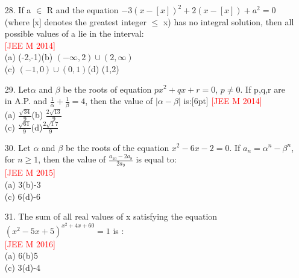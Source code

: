 \documentclass[journal,12pt,twocolumn]{IEEEtran}
\theoremstyle{remark}
\begin{document}
\begin{enumerate}
(c)  1:3:2\hspace{2.7cm}(d)  3:1:2\\[6pt] 
\item[28.]If a $\in$ R and the equation  $-3(x-[x])^2 +2(x-[x])+a^2 =0$ (where [x] denotes the greatest integer $\leq$ x) has no integral solution, then all possible values of a lie in the interval:\\[2pt]
\phantom{2cm}\hspace{4.8cm}\textcolor{red}{[JEE M 2014]}\\[6pt]
(a)  (-2,-1)\hspace{2.5cm}(b)  $(-\infty,2)\cup(2,\infty)$\\[2pt]
(c)  $(-1,0)\cup(0,1)$\hspace{1.1cm}(d)  (1,2)\\[6pt]
\item[29.]Let\quad$\alpha$ and $\beta$ be the roots of equation $px^2 + qx +r = 0$, $p\neq0$. If p,q,r are in A.P. and $\frac{1}{\alpha}+\frac{1}{\beta}=4$, then the value of $|\alpha-\beta|$ is:[6pt] \phantom{2cm}\hspace{4.8cm}\textcolor{red}{[JEE M 2014]}\\[6pt]
(a)  $\frac{\sqrt{34}}{9}$\hspace{5cm}(b)  $\frac{2\sqrt{13}}{9}$\\[2pt]
(c)  $\frac{\sqrt{61}}{9}$\hspace{5cm}(d)$\frac{2\sqrt17}{9}$\\[6pt]
\item[30.] Let $\alpha$ and $\beta$ be the roots of the equation $x^2-6x-2=0$. If $a_n=\alpha^n-\beta^n$, for $n\geq1$, then the value of $\frac{a_{10}-2a_8}{2a_9}$ is equal to:\\[6pt]
\phantom{2cm}\hspace{4.8cm}\textcolor{red}{[JEE M 2015]}\\[6pt]
(a)  3\hspace{5cm}(b)-3\\[2pt]
(c)  6\hspace{5cm}(d)-6\\[6pt]
\item[31.] The sum of all real values of x satisfying the equation $(x^2-5x+5)^{x^2+4x+60}=1$ is :\\[6pt]\phantom{2cm}\hspace{4.8cm}\textcolor{red}{[JEE M 2016]}\\[6pt]
(a)  6\hspace{5cm}(b)5\\[2pt]
(c)  3\hspace{5cm}(d)-4\\[6pt]

\end{enumerate}
\end{document}
